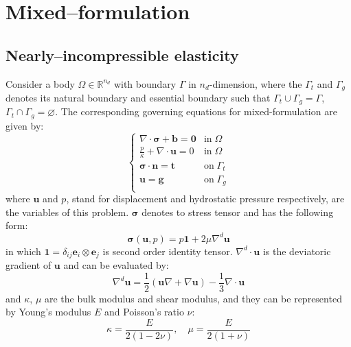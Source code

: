 \section{Mixed--formulation}
\subsection{Nearly--incompressible elasticity}
Consider a body $\Omega \in \mathbb R^{n_d}$ with boundary $\Gamma$ in $n_d$-dimension, where the $\Gamma_t$ and $\Gamma_g$ denotes its natural boundary and essential boundary such that $\Gamma_t \cup \Gamma_g = \Gamma$, $\Gamma_t \cap \Gamma_g = \varnothing$. The corresponding governing equations for mixed-formulation are given by:
\begin{equation}\label{strong}
\begin{cases}
    \nabla \cdot \boldsymbol \sigma + \boldsymbol b = \boldsymbol 0 & \mathrm{in} \; \Omega \\
    \frac{p}{\kappa} + \nabla \cdot \boldsymbol u = 0 & \mathrm{in} \; \Omega \\
    \boldsymbol \sigma \cdot \boldsymbol n = \boldsymbol t & \mathrm{on} \; \Gamma_t \\
    \boldsymbol u = \boldsymbol g & \mathrm{on} \; \Gamma_g \\
\end{cases}
\end{equation}
where $\boldsymbol u$ and $p$, stand for displacement and hydrostatic pressure respectively, are the variables of this problem. $\boldsymbol \sigma$ denotes to stress tensor and has the following form: 
\begin{equation}\label{stress}
    \boldsymbol \sigma(\boldsymbol u, p) = p \boldsymbol 1 + 2\mu \nabla^d \boldsymbol u
\end{equation}
in which $\boldsymbol 1 = \delta_{ij} \boldsymbol e_i \otimes \boldsymbol e_j$ is second order identity tensor.
$\nabla^d \cdot \boldsymbol u$ is the deviatoric gradient of $\boldsymbol u$ and can be evaluated by:
\begin{equation}
\nabla^d \boldsymbol u = \frac{1}{2}(\boldsymbol u \nabla + \nabla \boldsymbol u) - \frac{1}{3} \nabla \cdot \boldsymbol u
\end{equation}
and $\kappa$, $\mu$ are the bulk modulus and shear modulus, and they can be represented by Young's modulus $E$ and Poisson's ratio $\nu$:
\begin{equation}\label{modulus}
\kappa = \frac{E}{2(1-2\nu)}, \quad \mu = \frac{E}{2(1+\nu)}
\end{equation}

